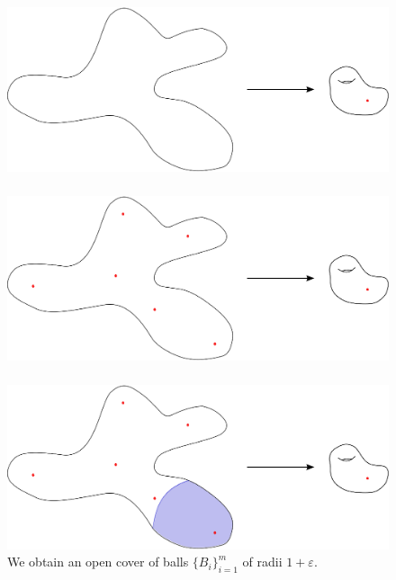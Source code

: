 \documentclass{beamer}
\begin{document}
\begin{frame}\frametitle{}

\begin{figure}
\centering
\includegraphics[scale=0.6]{Nerving2.eps}
\end{figure}


\end{frame}


\begin{frame}\frametitle{}

\begin{figure}
\centering
\includegraphics[scale=0.6]{Nerving3.eps}
\end{figure}


\end{frame}


\begin{frame}\frametitle{}

\begin{figure}
\centering
\includegraphics[scale=0.6]{Nerving4.eps}
\caption{We obtain an open cover of balls $\{ B_i \}_{i=1}^m$ of radii $1+\varepsilon$.}
\end{figure}


\end{frame}
\end{document}
